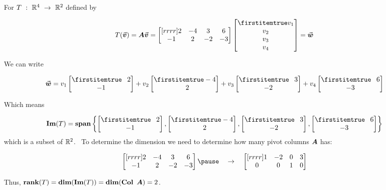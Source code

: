 \documentclass{beamer}
\begin{document}
\begin{frame}
\begin{example}
For $T\ :\ \mathbb{R}^4\ \rightarrow\ \mathbb{R}^2$ defined by

\vspace{-6mm}
\begin{equation*}
T(\vect{v})=\mat{A}\vect{v}=
\begin{bmatrix}[rrrr]
2 & -4 & 3 & 6 \\
-1 & 2 & -2 & -3 \\
\end{bmatrix}
\bvector{v_1,v_2,v_3,v_4}=\vect{w}
\end{equation*}\pause

\vspace{-6mm}
We can write

\vspace{-1mm}
\begin{equation*}
\vect{w}=v_1 \bvector{\+2,-1} + v_2 \bvector{-4,\+2} + v_3 \bvector{\+3,-2} + v_4 \bvector{\+6,-3}
\end{equation*}\pause

\vspace{-6mm}
Which means 

\vspace{-1mm}
\begin{equation*}
\im(T)=\spn\left\{\bvector{\+2,-1}, \bvector{-4,\+2}, \bvector{\+3,-2}, \bvector{\+6,-3}\right\}
\end{equation*}
which is a subset of $\mathbb{R}^2$.\pause 
~To determine the dimension we need to determine how many pivot columns $\boldsymbol{A}$ has:

\vspace{-2mm}
\begin{equation*}
\begin{bmatrix}[rrrr]
2 & -4 & 3 & 6 \\
-1 & 2 & -2 & -3 \\
\end{bmatrix}\pause
\quad\rightarrow\quad
\begin{bmatrix}[rrrr]
1 & -2 & 0 & 3 \\
0 & 0 & 1 & 0 \\
\end{bmatrix}
\end{equation*}

\vspace{-3mm}
Thus, $\rank(T)=\dim(\im(T))=\dim(\Col\mat{A})=2$.
\end{example}
\end{frame}
\end{document}
